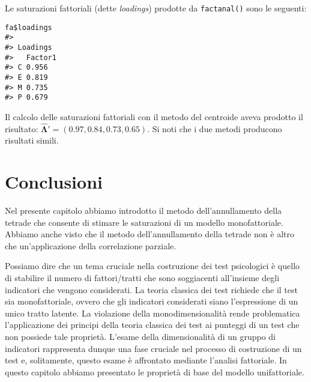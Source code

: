 Le saturazioni fattoriali (dette \textit{loadings}) prodotte da {\tt factanal()} sono le seguenti: 
\begin{lstlisting}
fa$loadings
#> 
#> Loadings
#>   Factor1
#> C 0.956  
#> E 0.819  
#> M 0.735  
#> P 0.679  
\end{lstlisting}
Il calcolo delle saturazioni fattoriali con il metodo del centroide aveva prodotto il risultato: $\boldsymbol{\hat{\Lambda}}'= (0.97, 0.84, 0.73, 0.65)$. 
Si noti che i due metodi producono risultati simili.


\section*{Conclusioni}

Nel presente capitolo abbiamo introdotto il metodo dell'annullamento della tetrade che consente di stimare le saturazioni di un modello monofattoriale.
Abbiamo anche visto che il metodo dell'annullamento della tetrade non è altro che un'applicazione della correlazione parziale.

Possiamo dire che un tema cruciale nella costruzione dei test psicologici è quello di stabilire il numero di fattori/tratti che sono soggiacenti all'insieme degli indicatori che vengono considerati.  
La teoria classica dei test richiede che il test sia monofattoriale, ovvero che gli indicatori considerati siano l'espressione di un unico tratto latente.
La violazione della monodimensionalità rende problematica l'ap\-pli\-ca\-zio\-ne dei principi della teoria classica dei test ai punteggi di un test che non possiede tale proprietà. 
L'esame della dimensionalità di un gruppo di indicatori rappresenta dunque una fase cruciale nel processo di costruzione di un test e, solitamente, questo esame è affrontato mediante l'analisi fattoriale.
In questo capitolo abbiamo presentato le proprietà di base del modello unifattoriale.



